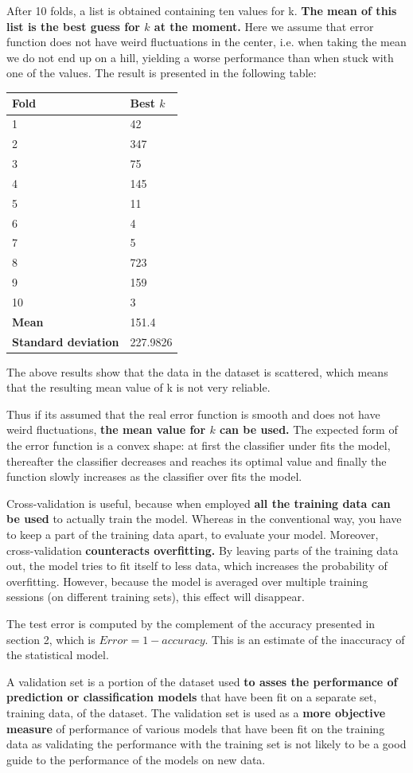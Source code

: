 \documentclass[a4paper]{article}
\begin{document}
After 10 folds, a list is obtained containing ten values for k. \textbf{The mean of this list is the best guess for $k$ at the moment.} Here we assume that error function does not have weird fluctuations in the center, i.e. when taking the mean we do not end up on a hill, yielding a worse performance than when stuck with one of the values. The result is presented in the following table:
\begin{center}
\begin{tabular}{ | l | l | }
\hline
\textbf{Fold} & \textbf{Best $k$}\\
\hline
1 & 42\\
\hline
2 &347\\
\hline
3 & 75\\
\hline
4 & 145\\
\hline
5 & 11\\
\hline
6 & 4\\
\hline
7 & 5\\
\hline
8 & 723\\
\hline
9 & 159\\
\hline
10 & 3\\
\hline
\textbf{Mean} & 151.4\\
\hline
\textbf{Standard deviation} & 227.9826\\
\hline
\end{tabular}
\end{center}
The above results show that the data in the dataset is scattered, which means that the resulting mean value of k is not very reliable.

Thus if its assumed that the real error function is smooth and does not have weird fluctuations, \textbf{the mean value for $k$ can be used.} The expected form of the error function is a convex shape: at first the classifier under fits the model, thereafter the classifier decreases and reaches its optimal value and finally the function slowly increases as the classifier over fits the model.

Cross-validation is useful, because when employed \textbf{all the training data can be used} to actually train the model. Whereas in the conventional way, you have to keep a part of the training data apart, to evaluate your model. Moreover, cross-validation \textbf{counteracts overfitting.} By leaving parts of the training data out, the model tries to fit itself to less data, which increases the probability of overfitting. However, because the model is averaged over multiple training sessions (on different training sets), this effect will disappear.

The test error is computed by the complement of the accuracy presented in section 2, which is $Error = 1 - accuracy$. This is an estimate of the inaccuracy of the statistical model.

A validation set is a portion of the dataset used \textbf{to asses the performance of prediction or classification models} that have been fit on a separate set, training data, of the dataset. The validation set is used as a \textbf{more objective measure} of performance of various models that have been fit on the training data as validating the performance with the training set is not likely to be a good guide to the performance of the models on new data. 
\end{document}
